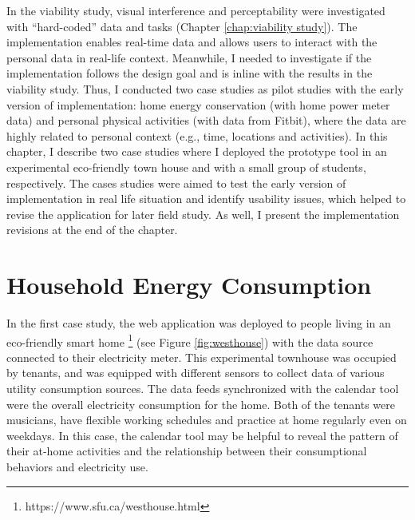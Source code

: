 \documentclass[12pt,oneside]{book}
\begin{document}

\label{chap:pilot studies}
In the viability study, visual interference and perceptability were investigated with ``hard-coded'' data and tasks (Chapter \ref{chap:viability study}). The implementation enables real-time data and allows users to interact with the personal data in real-life context.  Meanwhile, I needed to investigate if the implementation follows the design goal and is inline with the results in the viability study.
Thus, I conducted two case studies as pilot studies with the early version of implementation: home energy conservation (with home power meter data) and personal physical activities (with data from Fitbit), where the data are highly related to personal context (e.g., time, locations and activities).  In this chapter, I describe two case studies where I deployed the prototype tool in an experimental eco-friendly town house and with a small group of students, respectively. The cases studies were aimed to  test the early version of implementation in real life situation and identify usability issues, which helped to revise the application for later field study.  As well, I present the implementation revisions at the end of the chapter.

\section{Household Energy Consumption}
In the first case study, the web application was deployed to people living in an eco-friendly smart home \footnote{https://www.sfu.ca/westhouse.html} (see Figure \ref{fig:westhouse}) with the data source connected to their electricity meter.  This experimental townhouse was occupied by tenants, and was equipped with different sensors to collect data of various utility consumption sources.  The data feeds synchronized with the calendar tool were the overall electricity consumption for the home.  Both of the tenants were musicians, have flexible working schedules and practice at home regularly even on weekdays. In this case, the calendar tool may be helpful to reveal the pattern of their at-home activities and the relationship between their consumptional behaviors and electricity use.
\end{document}
